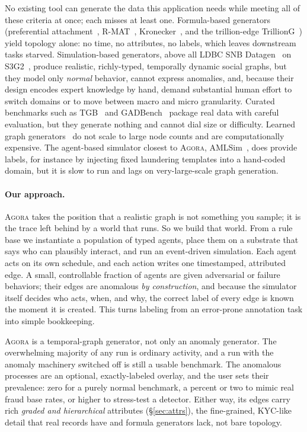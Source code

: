 \documentclass[sigconf,review,anonymous]{acmart}
\newcommand{\sys}{\textsc{Agora}\xspace}
\begin{document}
No existing tool can generate the data this application needs while meeting all of
these criteria at once; each misses at least one. Formula-based generators (preferential
attachment~\cite{barabasi1999emergence}, R-MAT~\cite{chakrabarti2004rmat},
Kronecker~\cite{leskovec2010kronecker}, and the trillion-edge
TrillionG~\cite{park2017trilliong}) yield topology alone: no time, no attributes, no
labels, which leaves downstream tasks starved. Simulation-based generators, above all
LDBC SNB Datagen~\cite{erling2015ldbc} on S3G2~\cite{pham2012s3g2}, produce realistic,
richly-typed, temporally dynamic social graphs, but they model only \emph{normal}
behavior, cannot express anomalies, and, because their design encodes expert knowledge
by hand, demand substantial human effort to switch domains or to move between macro and
micro granularity. Curated benchmarks such as TGB~\cite{huang2023tgb} and
GADBench~\cite{tang2023gadbench} package real data with careful evaluation, but they
generate nothing and cannot dial size or difficulty. Learned graph
generators~\cite{you2018graphrnn,gupta2022tigger} do not scale to large node counts and
are computationally expensive. The agent-based simulator closest to \sys{},
AMLSim~\cite{suzumura2021amlsim}, does provide labels, for instance by injecting fixed
laundering templates into a hand-coded domain, but it is slow to run and lags on
very-large-scale graph generation.

\paragraph{Our approach.}
\sys{} takes the position that a realistic graph is not something you sample; it is
the trace left behind by a world that runs. So we build that world. From a rule base we
instantiate a population of typed agents, place them on a substrate that says who can
plausibly interact, and run an event-driven simulation. Each agent acts on its own
schedule, and each action writes one timestamped, attributed edge. A small,
controllable fraction of agents are given adversarial or failure behaviors; their edges
are anomalous \emph{by construction}, and because the simulator itself decides who
acts, when, and why, the correct label of every edge is known the moment it is created.
This turns labeling from an error-prone annotation task into simple bookkeeping.

\sys{} is a temporal-graph generator, not only an anomaly generator. The overwhelming
majority of any run is ordinary activity, and a run with the anomaly machinery switched
off is still a usable benchmark. The anomalous processes are an optional,
exactly-labeled overlay, and the user sets their prevalence: zero for a purely normal
benchmark, a percent or two to mimic real fraud base rates, or higher to stress-test a
detector. Either way, its edges carry rich \emph{graded and hierarchical} attributes
(\S\ref{sec:attrs}), the fine-grained, KYC-like detail that real records have and
formula generators lack, not bare topology.
\end{document}
